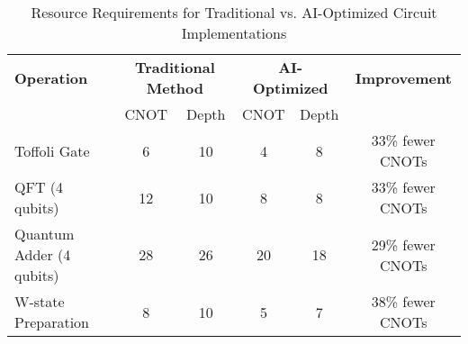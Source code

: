\begin{table}[!t]
\centering
\caption{Resource Requirements for Traditional vs. AI-Optimized Circuit Implementations}
\label{tab:circuit_comparison}
\begin{tabular}{@{}lccccc@{}}
\toprule
\textbf{Operation} & \multicolumn{2}{c}{\textbf{Traditional Method}} & \multicolumn{2}{c}{\textbf{AI-Optimized}} & \textbf{Improvement} \\
\cmidrule(lr){2-3} \cmidrule(lr){4-5}
& CNOT & Depth & CNOT & Depth & \\
\midrule
Toffoli Gate & 6 & 10 & 4 & 8 & 33\% fewer CNOTs \\
QFT (4 qubits) & 12 & 10 & 8 & 8 & 33\% fewer CNOTs \\
Quantum Adder (4 qubits) & 28 & 26 & 20 & 18 & 29\% fewer CNOTs \\
W-state Preparation & 8 & 10 & 5 & 7 & 38\% fewer CNOTs \\
\bottomrule
\end{tabular}
\end{table} 
